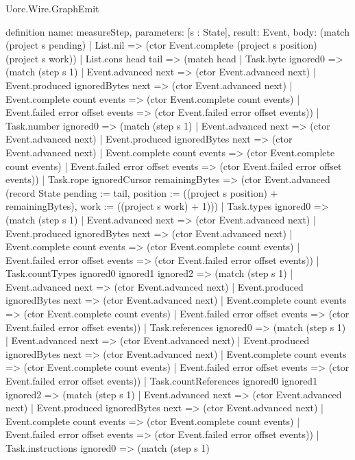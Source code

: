 \begin{lexlean}{Uorc.Wire.GraphEmit}
\begin{semanticmodule}
definition{
  name: measureStep,
  parameters: [s : State],
  result: Event,
  body: (match (project s pending)
    | List.nil => (ctor Event.complete (project s position) (project s work))
    | List.cons head tail => (match head
      | Task.byte ignored0 => (match (step s 1)
        | Event.advanced next => (ctor Event.advanced next)
        | Event.produced ignoredBytes next => (ctor Event.advanced next)
        | Event.complete count events => (ctor Event.complete count events)
        | Event.failed error offset events => (ctor Event.failed error offset events))
      | Task.number ignored0 => (match (step s 1)
        | Event.advanced next => (ctor Event.advanced next)
        | Event.produced ignoredBytes next => (ctor Event.advanced next)
        | Event.complete count events => (ctor Event.complete count events)
        | Event.failed error offset events => (ctor Event.failed error offset events))
      | Task.rope ignoredCursor remainingBytes => (ctor Event.advanced (record State {pending := tail, position := ((project s position) + remainingBytes), work := ((project s work) + 1)}))
      | Task.types ignored0 => (match (step s 1)
        | Event.advanced next => (ctor Event.advanced next)
        | Event.produced ignoredBytes next => (ctor Event.advanced next)
        | Event.complete count events => (ctor Event.complete count events)
        | Event.failed error offset events => (ctor Event.failed error offset events))
      | Task.countTypes ignored0 ignored1 ignored2 => (match (step s 1)
        | Event.advanced next => (ctor Event.advanced next)
        | Event.produced ignoredBytes next => (ctor Event.advanced next)
        | Event.complete count events => (ctor Event.complete count events)
        | Event.failed error offset events => (ctor Event.failed error offset events))
      | Task.references ignored0 => (match (step s 1)
        | Event.advanced next => (ctor Event.advanced next)
        | Event.produced ignoredBytes next => (ctor Event.advanced next)
        | Event.complete count events => (ctor Event.complete count events)
        | Event.failed error offset events => (ctor Event.failed error offset events))
      | Task.countReferences ignored0 ignored1 ignored2 => (match (step s 1)
        | Event.advanced next => (ctor Event.advanced next)
        | Event.produced ignoredBytes next => (ctor Event.advanced next)
        | Event.complete count events => (ctor Event.complete count events)
        | Event.failed error offset events => (ctor Event.failed error offset events))
      | Task.instructions ignored0 => (match (step s 1)
}
\end{semanticmodule}
\end{lexlean}
